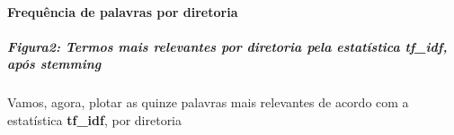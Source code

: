 \documentclass[]{article}
\newenvironment{Shaded}{\begin{snugshade}}{\end{snugshade}}
\newcommand{\KeywordTok}[1]{\textcolor[rgb]{0.13,0.29,0.53}{\textbf{#1}}}
\newcommand{\DataTypeTok}[1]{\textcolor[rgb]{0.13,0.29,0.53}{#1}}
\newcommand{\StringTok}[1]{\textcolor[rgb]{0.31,0.60,0.02}{#1}}
\newcommand{\CommentTok}[1]{\textcolor[rgb]{0.56,0.35,0.01}{\textit{#1}}}
\newcommand{\OtherTok}[1]{\textcolor[rgb]{0.56,0.35,0.01}{#1}}
\newcommand{\OperatorTok}[1]{\textcolor[rgb]{0.81,0.36,0.00}{\textbf{#1}}}
\newcommand{\NormalTok}[1]{#1}
\let\oldparagraph\paragraph
\renewcommand{\paragraph}[1]{\oldparagraph{#1}\mbox{}}
\let\oldsubparagraph\subparagraph
\renewcommand{\subparagraph}[1]{\oldsubparagraph{#1}\mbox{}}
\begin{document}
\paragraph{Frequência de palavras por
diretoria}\label{frequencia-de-palavras-por-diretoria}

\begin{Shaded}
\end{Shaded}

\subparagraph{\texorpdfstring{Figura2: Termos mais relevantes por
diretoria pela estatística \textbf{tf\_idf}, após
\textbf{stemming}}{Figura2: Termos mais relevantes por diretoria pela estatística tf\_idf, após stemming}}\label{figura2-termos-mais-relevantes-por-diretoria-pela-estatistica-tf_idf-apos-stemming}

Vamos, agora, plotar as quinze palavras mais relevantes de acordo com a
estatística \textbf{tf\_idf}, por diretoria
\end{document}
